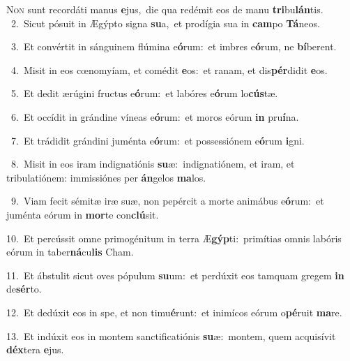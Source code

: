 \lettrine{\initial\textcolor{\initialcolor}{N}}{on} sunt recordáti manus \textbf{e}\-jus,~\star die qua redémit eos de manu \textbf{tri}\-bu\-\textbf{lán}\-tis.\\
{\numbfont\textcolor{\numbcolor}{~2.}}~Sicut pósuit in Ægýpto signa \textbf{su}\-a,~\star et prodígia sua in \textbf{cam}\-po \textbf{Tá}\-neos.\par
{\numbfont\textcolor{\numbcolor}{~3.}}~Et convértit in sánguinem flúmina e\-\textbf{ó}\-rum:~\star et imbres e\-\textbf{ó}\-rum, ne \textbf{bí}\-berent.\par
{\numbfont\textcolor{\numbcolor}{~4.}}~Misit in eos cœnomyíam, et comédit \textbf{e}\-os:~\star et ranam, et dis\-\textbf{pér}\-didit \textbf{e}\-os.\par
{\numbfont\textcolor{\numbcolor}{~5.}}~Et dedit ærúgini fructus e\-\textbf{ó}\-rum:~\star et labóres e\-\textbf{ó}\-rum lo\-\textbf{cús}\-tæ.\par
{\numbfont\textcolor{\numbcolor}{~6.}}~Et occídit in grándine víneas e\-\textbf{ó}\-rum:~\star et moros eórum \textbf{in} pru\-\textbf{í}\-na.\par
{\numbfont\textcolor{\numbcolor}{~7.}}~Et trádidit grándini juménta e\-\textbf{ó}\-rum:~\star et possessiónem e\-\textbf{ó}\-rum \textbf{i}\-gni.\par
{\numbfont\textcolor{\numbcolor}{~8.}}~Misit in eos iram indignatiónis \textbf{su}\-æ:~\star indignatiónem, et iram, et tribulatiónem: immissiónes per \textbf{án}\-gelos \textbf{ma}\-los.\par
{\numbfont\textcolor{\numbcolor}{~9.}}~Viam fecit sémitæ iræ suæ, non pepércit a morte animábus e\-\textbf{ó}\-rum:~\star et juménta eórum in \textbf{mor}\-te con\-\textbf{clú}\-sit.\par
{\numbfont\textcolor{\numbcolor}{10.}}~Et percússit omne primogénitum in terra Æ\-\textbf{gýp}\-ti:~\star primítias omnis labóris eórum in taber\-\textbf{ná}\-cu\textbf{lis} Cham.\par
{\numbfont\textcolor{\numbcolor}{11.}}~Et ábstulit sicut oves pópulum \textbf{su}\-um:~\star et perdúxit eos tamquam gregem \textbf{in} de\-\textbf{sér}\-to.\par
{\numbfont\textcolor{\numbcolor}{12.}}~Et dedúxit eos in spe, et non timu\-\textbf{é}\-runt:~\star et inimícos eórum o\-\textbf{pé}\-ruit \textbf{ma}\-re.\par
{\numbfont\textcolor{\numbcolor}{13.}}~Et indúxit eos in montem sanctificatiónis \textbf{su}\-æ:~\star montem, quem acquisívit \textbf{déx}\-tera \textbf{e}\-jus.\par
